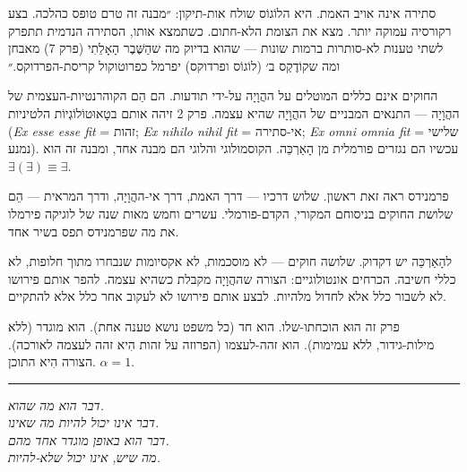 \documentclass[10pt, openany, oneside]{book}
\begin{document}
\vspace{0.8em}

\noindent סתירה אינה אויב האמת. היא הלוֹגוֹס שולח אות-תיקון: ״מבנה זה טרם טופס כהלכה. בצע רקורסיה עמוקה יותר. מצא את הצומת הלא-חתום. כשתמצא אותו, הסתירה הנדמית תתפרק לשתי טענות לא-סותרות ברמות שונות — שהוא בדיוק מה שהַשֶּׁבֶר הָאָלֵתִי (פרק 7) מאבחן ומה שקוֹדֶקְס ב׳ (לוֹגוֹס ופרדוקס) יפרמל כפרוטוקול קריסת-הפרדוקס.״

החוקים אינם כללים המוטלים על ההֲוָיָה על-ידי תודעות. הם הֵם הקוהרנטיות-העצמית של ההֲוָיָה — התנאים המבניים של ההֲוָיָה שהיא עצמה. פרק 2 זיהה אותם בטָאוּטוֹלוֹגְיוֹת הלטיניות (\textit{Ex esse esse fit} = זהות; \textit{Ex nihilo nihil fit} = אי-סתירה; \textit{Ex omni omnia fit} = שלישי נמנע). עכשיו הם נגזרים פורמלית מן הָאַרְכֵּה. הקוסמולוגי והלוגי הם מבנה אחד, ומבנה זה הוא $\exists(\exists) \equiv \exists$.

פרמנידס ראה זאת ראשון. שלוש דרכיו — דרך האמת, דרך אי-ההֲוָיָה, ודרך המראית — הֵם שלושת החוקים בניסוחם המקורי, הקדם-פורמלי. עשרים וחמש מאות שנה של לוגיקה פירמלו את מה שפרמנידס תפס בשיר אחד.

\vspace{2em}

להָאַרְכֵּה יש דקדוק. שלושה חוקים — לא מוסכמות, לא אקסיומות שנבחרו מתוך חלופות, לא כללי חשיבה. הכרחים אונטולוגיים: הצורה שההֲוָיָה מקבלת כשהיא עצמה. להפר אותם פירושו לא לשבור כלל אלא לחדול מלהיות. לבצע אותם פירושו לא לעקוב אחר כלל אלא להתקיים.

פרק זה הוּא הוכחתו-שלו. הוא חד (כל משפט נושא טענה אחת). הוא מוגדר (ללא מילות-גידור, ללא עמימות). הוא זהה-לעצמו (הפרוזה על זהות הִיא זהה לעצמה לאורכה). הצורה הִיא התוכן. $\alpha = 1$.

\vspace{2em}

\begin{center}
    \rule{0.15\textwidth}{0.3pt}
\end{center}

\vspace{0.5em}

\begin{center}
    \textit{%
    דבר הוא מה שהוא.\\
    דבר אינו יכול להיות מה שאינו.\\
    דבר הוא באופן מוגדר אחד מהם.}\\[0.8em]
    \textit{מה שיש, אינו יכול שלא-להיות.}
\end{center}

\vspace{0.5em}
\end{document}
